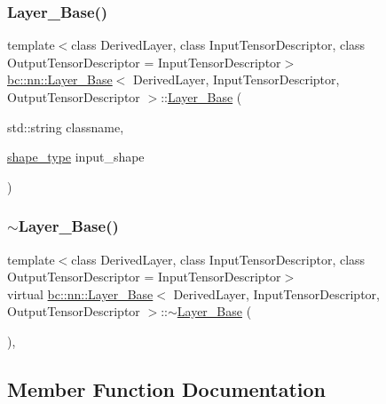 \subsubsection{\texorpdfstring{Layer\+\_\+\+Base()}{Layer\_Base()}\hspace{0.1cm}{\footnotesize\ttfamily [2/2]}}
{\footnotesize\ttfamily template$<$class Derived\+Layer, class Input\+Tensor\+Descriptor, class Output\+Tensor\+Descriptor = Input\+Tensor\+Descriptor$>$ \\
\hyperlink{structbc_1_1nn_1_1Layer__Base}{bc\+::nn\+::\+Layer\+\_\+\+Base}$<$ Derived\+Layer, Input\+Tensor\+Descriptor, Output\+Tensor\+Descriptor $>$\+::\hyperlink{structbc_1_1nn_1_1Layer__Base}{Layer\+\_\+\+Base} (\begin{DoxyParamCaption}\item[{std\+::string}]{classname,  }\item[{\hyperlink{structbc_1_1nn_1_1Layer__Base_ab8cbdaad20a0270b2555a91676a79932}{shape\+\_\+type}}]{input\+\_\+shape }\end{DoxyParamCaption})\hspace{0.3cm}{\ttfamily [inline]}}

\mbox{\label{structbc_1_1nn_1_1Layer__Base_a619861aa2a749d3eac142713765f1ead}} 
\subsubsection{\texorpdfstring{$\sim$\+Layer\+\_\+\+Base()}{~Layer\_Base()}}
{\footnotesize\ttfamily template$<$class Derived\+Layer, class Input\+Tensor\+Descriptor, class Output\+Tensor\+Descriptor = Input\+Tensor\+Descriptor$>$ \\
virtual \hyperlink{structbc_1_1nn_1_1Layer__Base}{bc\+::nn\+::\+Layer\+\_\+\+Base}$<$ Derived\+Layer, Input\+Tensor\+Descriptor, Output\+Tensor\+Descriptor $>$\+::$\sim$\hyperlink{structbc_1_1nn_1_1Layer__Base}{Layer\+\_\+\+Base} (\begin{DoxyParamCaption}{ }\end{DoxyParamCaption})\hspace{0.3cm}{\ttfamily [inline]}, {\ttfamily [virtual]}}



\subsection{Member Function Documentation}
\mbox{\label{structbc_1_1nn_1_1Layer__Base_a2602afd12a449c9d1200254b9fce14f7}} 
